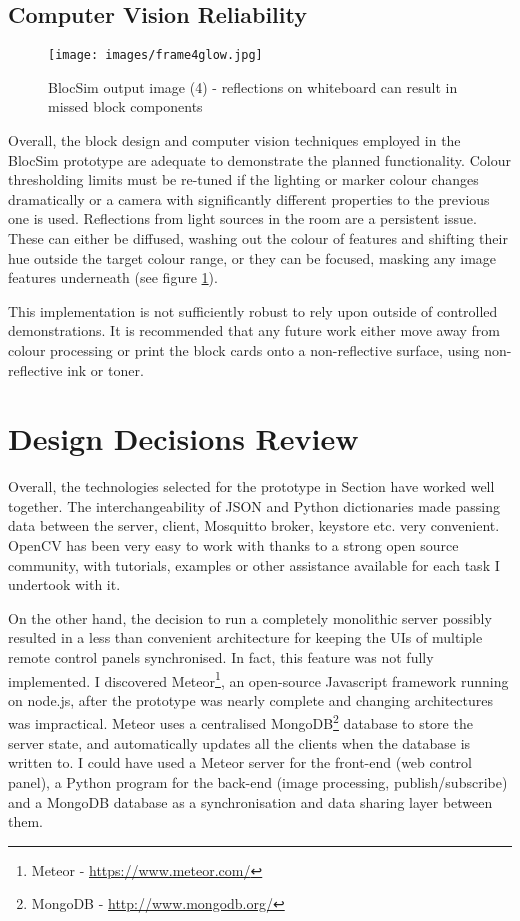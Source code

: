 \newpage

\subsection{Computer Vision Reliability}

\begin{figure}[ht!]
\centering
\texttt{[image: images/frame4glow.jpg]}
\caption{BlocSim output image (4) - reflections on whiteboard can result in missed block components}
\label{im:frame4glow}
\end{figure}

Overall, the block design and computer vision techniques employed in the BlocSim prototype are adequate to demonstrate the planned functionality. Colour thresholding limits must be re-tuned if the lighting or marker colour changes dramatically or a camera with significantly different properties to the previous one is used. Reflections from light sources in the room are a persistent issue. These can either be diffused, washing out the colour of features and shifting their hue outside the target colour range, or they can be focused, masking any image features underneath (see figure \ref{im:frame4glow}).

This implementation is not sufficiently robust to rely upon outside of controlled demonstrations. It is recommended that any future work either move away from colour processing or print the block cards onto a non-reflective surface, using non-reflective ink or toner.

\section{Design Decisions Review}
\label{ch:review:design}

Overall, the technologies selected for the prototype in Section \label{sec:techSelection} have worked well together. The interchangeability of JSON and Python dictionaries made passing data between the server, client, Mosquitto broker, keystore etc. very convenient. OpenCV has been very easy to work with thanks to a strong open source community, with tutorials, examples or other assistance available for each task I undertook with it.

On the other hand, the decision to run a completely monolithic server possibly resulted in a less than convenient architecture for keeping the UIs of multiple remote control panels synchronised. In fact, this feature was not fully implemented. I discovered Meteor\footnote{Meteor - \url{https://www.meteor.com/}}, an open-source Javascript framework running on node.js, after the prototype was nearly complete and changing architectures was impractical. Meteor uses a centralised MongoDB\footnote{MongoDB - \url{http://www.mongodb.org/}} database to store the server state, and automatically updates all the clients when the database is written to. I could have used a Meteor server for the front-end (web control panel), a Python program for the back-end (image processing, publish/subscribe) and a MongoDB database as a synchronisation and data sharing layer between them.


